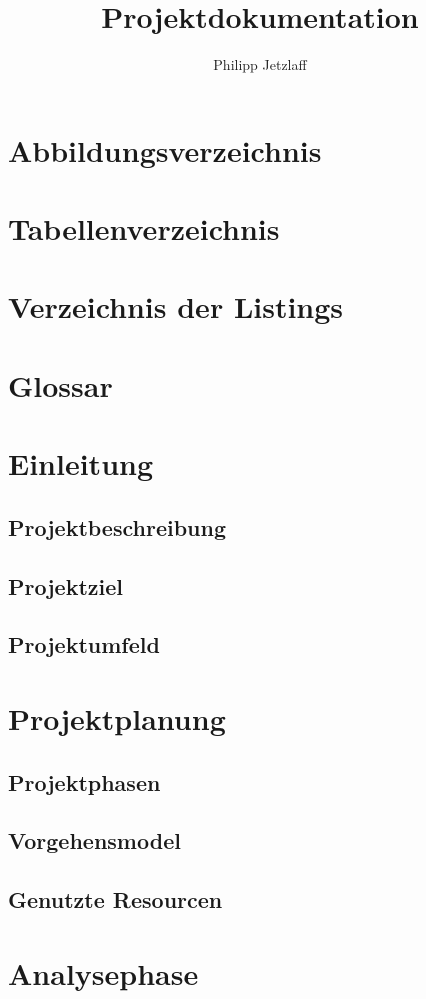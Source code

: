 \documentclass[oneside]{article}
\author{Philipp Jetzlaff}
\title{Projektdokumentation}
\begin{document}
  \pagestyle{fancy}
  
  \tableofcontents
  \clearpage
  \section{Abbildungsverzeichnis}
  \newpage
  \section{Tabellenverzeichnis}
  \newpage
  \section{Verzeichnis der Listings}
  \newpage
  \section{Glossar}
  \newpage
  \section{Einleitung}
  \subsection{Projektbeschreibung}
  \subsection{Projektziel}
  \subsection{Projektumfeld}
  \section{Projektplanung}
  \subsection{Projektphasen}
  \subsection{Vorgehensmodel}
  \subsection{Genutzte Resourcen}
  \section{Analysephase}
\end{document}
